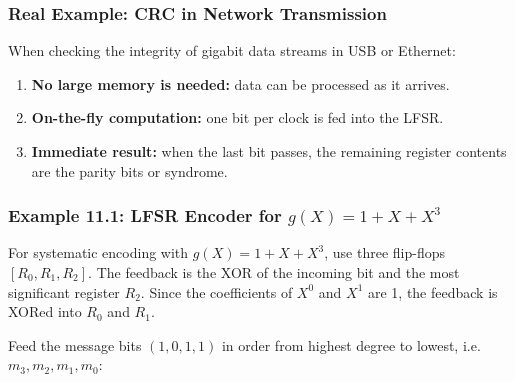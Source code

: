 \documentclass[11pt,oneside]{book}
\providecommand{\tightlist}{\setlength{\itemsep}{0pt}\setlength{\parskip}{0pt}}
\theoremstyle{plain}
\theoremstyle{definition}
\theoremstyle{remark}
\begin{document}
\subsubsection{Real Example: CRC in Network
Transmission}\label{real-example-crc-in-network-transmission}

When checking the integrity of gigabit data streams in USB or Ethernet:

\begin{enumerate}
\def\labelenumi{\arabic{enumi}.}
\tightlist
\item
  \textbf{No large memory is needed:} data can be processed as it
  arrives.
\item
  \textbf{On-the-fly computation:} one bit per clock is fed into the
  LFSR.
\item
  \textbf{Immediate result:} when the last bit passes, the remaining
  register contents are the parity bits or syndrome.
\end{enumerate}

\subsubsection{\texorpdfstring{Example 11.1: LFSR Encoder for
\(g(X)=1+X+X^3\)}{Example 11.1: LFSR Encoder for g(X)=1+X+X\^{}3}}\label{example-11.1-lfsr-encoder-for-gx1xx3}

For systematic encoding with \(g(X)=1+X+X^3\), use three flip-flops
\([R_0,R_1,R_2]\). The feedback is the XOR of the incoming bit and the
most significant register \(R_2\). Since the coefficients of \(X^0\) and
\(X^1\) are 1, the feedback is XORed into \(R_0\) and \(R_1\).

Feed the message bits \((1,0,1,1)\) in order from highest degree to
lowest, i.e.~\(m_3,m_2,m_1,m_0\):
\end{document}
